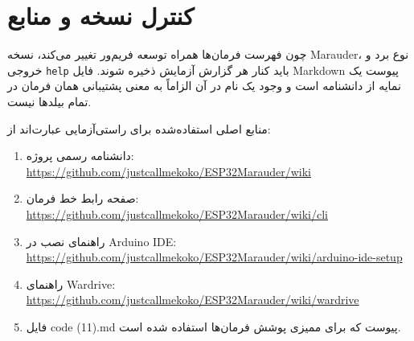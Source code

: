 \documentclass[11pt,a4paper]{article}
\newif\ifxepersianavailable
\newcommand{\lr}[1]{\foreignlanguage{english}{#1}}
\newcommand{\en}[1]{\lr{#1}}
\newcommand{\cmd}[1]{\lr{\nolinkurl{#1}}}
\begin{document}
\section{کنترل نسخه و منابع}
چون فهرست فرمان‌ها همراه توسعه فریم‌ور تغییر می‌کند، نسخه Marauder، نوع برد و خروجی \cmd{help} باید کنار هر گزارش آزمایش ذخیره شوند. فایل \en{Markdown} پیوست یک نمایه از دانشنامه است و وجود یک نام در آن الزاماً به معنی پشتیبانی همان فرمان در تمام بیلدها نیست.

منابع اصلی استفاده‌شده برای راستی‌آزمایی عبارت‌اند از:
\begin{enumerate}
    \item دانشنامه رسمی پروژه: \url{https://github.com/justcallmekoko/ESP32Marauder/wiki}
    \item صفحه رابط خط فرمان: \url{https://github.com/justcallmekoko/ESP32Marauder/wiki/cli}
    \item راهنمای نصب در \en{Arduino IDE}: \url{https://github.com/justcallmekoko/ESP32Marauder/wiki/arduino-ide-setup}
    \item راهنمای \en{Wardrive}: \url{https://github.com/justcallmekoko/ESP32Marauder/wiki/wardrive}
    \item فایل \en{code (11).md} پیوست که برای ممیزی پوشش فرمان‌ها استفاده شده است.
\end{enumerate}

\ifxepersianavailable\else\endR\fi
\end{document}
